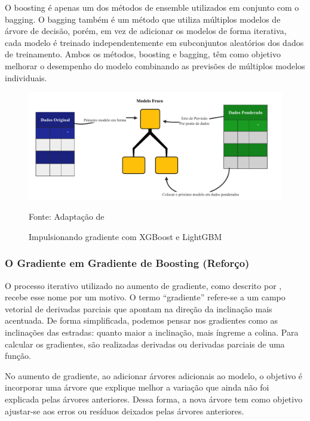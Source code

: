 O boosting é apenas um dos métodos de ensemble utilizados em conjunto com o bagging. O bagging também é um método que utiliza múltiplos modelos de árvore de decisão, porém, em vez de adicionar os modelos de forma iterativa, cada modelo é treinado independentemente em subconjuntos aleatórios dos dados de treinamento. Ambos os métodos, boosting e bagging, têm como objetivo melhorar o desempenho do modelo combinando as previsões de múltiplos modelos individuais.


\begin{figure}[H]
	\centering
	\caption{Impulsionando gradiente com XGBoost e LightGBM}
	\label{fig:xgboos}
	\includegraphics[width=0.9\linewidth]{Modelos/Figuras/xgboos}
	
	Fonte: Adaptação de 
\end{figure}



\subsubsection{O Gradiente em Gradiente de Boosting (Refor\c co)} \label{subsubsec:boosting}

O processo iterativo utilizado no aumento de gradiente, como descrito por , recebe esse nome por um motivo. O termo ``gradiente'' refere-se a um campo vetorial de derivadas parciais que apontam na direção da inclinação mais acentuada. De forma simplificada, podemos pensar nos gradientes como as inclinações das estradas: quanto maior a inclinação, mais íngreme a colina. Para calcular os gradientes, são realizadas derivadas ou derivadas parciais de uma função.

No aumento de gradiente, ao adicionar árvores adicionais ao modelo, o objetivo é incorporar uma árvore que explique melhor a variação que ainda não foi explicada pelas árvores anteriores. Dessa forma, a nova árvore tem como objetivo ajustar-se aos erros ou resíduos deixados pelas árvores anteriores.

